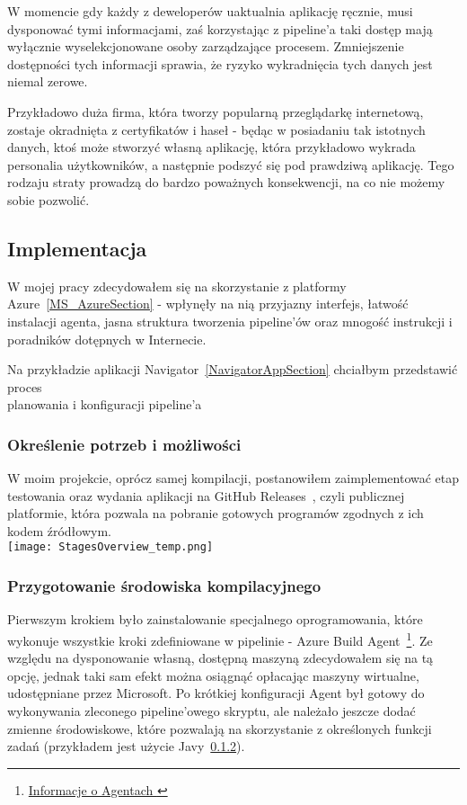 W momencie gdy każdy z deweloperów uaktualnia aplikację ręcznie, musi dysponować tymi informacjami,
zaś korzystając z pipeline'a taki dostęp mają wyłącznie wyselekcjonowane osoby zarządzające procesem.
Zmniejszenie dostępności tych informacji sprawia, że ryzyko wykradnięcia tych danych jest niemal zerowe.

Przykładowo duża firma, która tworzy popularną przeglądarkę internetową, zostaje okradnięta z certyfikatów i haseł - 
będąc w posiadaniu tak istotnych danych, ktoś może stworzyć własną aplikację, która przykładowo wykrada personalia użytkowników, 
a następnie podszyć się pod prawdziwą aplikację. 
Tego rodzaju straty prowadzą do bardzo poważnych konsekwencji, na co nie możemy sobie pozwolić.
\newpage

\subsection{Implementacja}
W mojej pracy zdecydowałem się na skorzystanie z platformy Azure~\ref{MS_AzureSection} - wpłynęły
na nią przyjazny interfejs, łatwość instalacji agenta, jasna struktura tworzenia pipeline'ów 
oraz mnogość instrukcji i poradników dotępnych w Internecie.

Na przykładzie aplikacji Navigator~\ref{NavigatorAppSection} chciałbym przedstawić proces \\
planowania i konfiguracji pipeline'a \todo{}

\subsubsection{Określenie potrzeb i możliwości}
W moim projekcie, oprócz samej kompilacji, postanowiłem zaimplementować etap testowania 
oraz wydania aplikacji na GitHub Releases~\todo{}, czyli publicznej platformie, która 
pozwala na pobranie gotowych programów zgodnych z ich kodem źródłowym. \\
\texttt{[image: StagesOverview\_temp.png]}

\subsubsection{Przygotowanie środowiska kompilacyjnego}
Pierwszym krokiem było zainstalowanie specjalnego oprogramowania, 
które wykonuje wszystkie kroki zdefiniowane w pipelinie - Azure Build Agent~\footnote[1]{
    \href{https://learn.microsoft.com/en-us/azure/devops/pipelines/agents/agents}{
        Informacje o Agentach
    }
}.
Ze względu na dysponowanie własną, dostępną maszyną zdecydowałem się na tą opcję,
jednak taki sam efekt można osiągnąć opłacając maszyny wirtualne, udostępniane przez Microsoft.
Po krótkiej konfiguracji Agent był gotowy do 
wykonywania zleconego pipeline'owego skryptu, ale należało jeszcze dodać zmienne środowiskowe, 
które pozwalają na skorzystanie z określonych funkcji zadań (przykładem jest użycie Javy~\ref{}).

